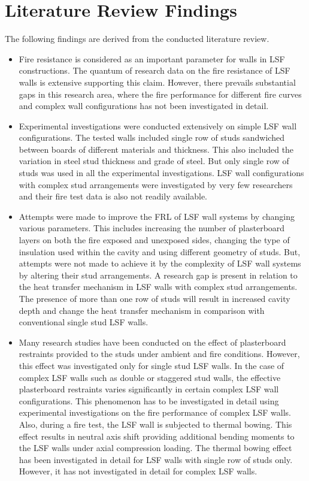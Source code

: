 \section{Literature Review Findings}
The following findings are derived from the conducted literature review.
\begin{itemize}
	\item Fire resistance is considered as an important parameter for walls in LSF constructions. The quantum of research data on the fire resistance of LSF walls is extensive supporting this claim. However, there prevails substantial gaps in this research area, where the fire performance for different fire curves and complex wall configurations has not been investigated in detail. 
	\item Experimental investigations were conducted extensively on simple LSF wall configurations. The tested walls included single row of studs sandwiched between boards of different materials and thickness. This also included the variation in steel stud thickness and grade of steel. But only single row of studs was used in all the experimental investigations. LSF wall configurations with complex stud arrangements were investigated by very few researchers and their fire test data is also not readily available.
	\item Attempts were made to improve the FRL of LSF wall systems by changing various parameters. This includes increasing the number of plasterboard layers on both the fire exposed and unexposed sides, changing the type of insulation used within the cavity and using different geometry of studs. But, attempts were not made to achieve it by the complexity of LSF wall systems by altering their stud arrangements. A research gap is present in relation to the heat transfer mechanism in LSF walls with complex stud arrangements. The presence of more than one row of studs will result in increased cavity depth and change the heat transfer mechanism in comparison with conventional single stud LSF walls.
	\item Many research studies have been conducted on the effect of plasterboard restraints provided to the studs under ambient and fire conditions. However, this effect was investigated only for single stud LSF walls. In the case of complex LSF walls such as double or staggered stud walls, the effective plasterboard restraints varies significantly in certain complex LSF wall configurations. This phenomenon has to be investigated in detail using experimental investigations on the fire performance of complex LSF walls. Also, during a fire test, the LSF wall is subjected to thermal bowing. This effect results in neutral axis shift providing additional bending moments to the LSF walls under axial compression loading. The thermal bowing effect has been investigated in detail for LSF walls with single row of studs only. However, it has not investigated in detail for complex LSF walls.    

\end{itemize}
